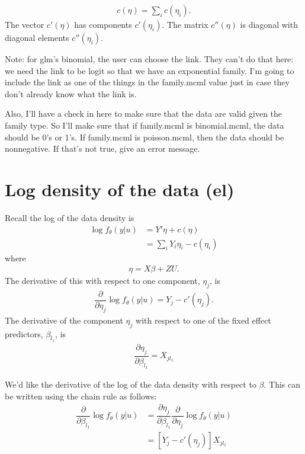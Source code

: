 \documentclass{article}
\begin{document}
\begin{align}
c(\eta)= \sum_i c(\eta_i).
\end{align}
 The vector $c'(\eta)$ has components $c'(\eta_i)$. The matrix $c''(\eta)$ is diagonal with diagonal elements $c''(\eta_i)$.

Note: for glm's binomial, the user can choose the link. They can't do that here: we need the link to be logit so that we have an exponential family. I'm going to include the link as one of the things in the family.mcml value just in case they don't already know what the link is.

Also, I'll have a check in here to make sure that the data are valid given the family type. So I'll make sure that if family.mcml is binomial.mcml, the data should be 0's or 1's. If family.mcml is poisson.mcml, then the data should be nonnegative. If that's not true, give an error message.

\section{Log density of the data (el)}

Recall the log of the data density is
\begin{align}
\log f_\theta(y|u) &= Y' \eta +c(\eta) \\
&= \sum_{i} Y_{i} {\eta_{i}} - c({\eta_{i}})
\end{align}
where
\begin{align}
\eta=X\beta+ZU.
\end{align}
The derivative of this with respect to one component, $\eta_j$, is
\begin{align}
\dfrac{\partial}{\partial \eta_j} \log f_\theta(y|u)  = Y_j-c'(\eta_j).
\end{align}
The derivative of the component $\eta_j$ with respect to one of the fixed effect predictors, $\beta_{l_1}$, is
\begin{align}
\dfrac{\partial \eta_j}{\partial \beta_{l_1}} = X_{j{l_1}}
\end{align}

We'd like the derivative of the log of the data density with respect to $\beta$. This can be written using the chain rule as follows:
\begin{align}
\dfrac{\partial}{\partial \beta_{l_1}}  \log f_\theta(y|u) &= \dfrac{\partial \eta_j}{\partial \beta_{l_1}} \dfrac{\partial}{\partial \eta_j} \log f_\theta(y|u) \\
&= \left[ Y_j-c'(\eta_j) \right]  X_{j{l_1}}
\end{align}
\end{document}
